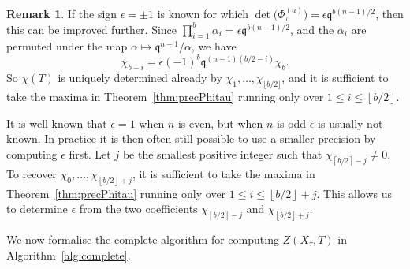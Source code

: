 \documentclass[a4paper,11pt]{article}
\numberwithin{equation}{section}
\providecommand{\floor}[1]{\left\lfloor#1\right\rfloor}   %
\providecommand{\ceil}[1]{\left\lceil#1\right\rceil}   %
\theoremstyle{definition}
\newtheorem{rem}[thm]{Remark}
\begin{document}
\begin{rem} \label{rem:epsilon}
If the sign $\epsilon = \pm 1$ is known for which 
$\det \bigl(\Phi_{\tau}^{(a)} \bigr) = \epsilon \mathfrak{q}^{b(n-1)/2}$, 
then this can be improved further. Since 
$\prod_{i=1}^b \alpha_i = \epsilon \mathfrak{q}^{b(n-1)/2}$, and 
the $\alpha_i$ are permuted under the map 
$\alpha \mapsto \mathfrak{q}^{n-1}/\alpha$, we have
\begin{equation*}
\chi_{b-i}=\epsilon (-1)^{b} \mathfrak{q}^{(n-1)(b/2-i)} \chi_b. 
\end{equation*}
So $\chi(T)$ is uniquely determined already by 
$\chi_1,\dotsc,\chi_{\lfloor b/2 \rfloor}$, and it is sufficient 
to take the maxima in Theorem~\ref{thm:precPhitau} running only over 
$1 \leq i \leq \floor{b/2}$.

It is well known that $\epsilon = 1$ when $n$ is even, but when $n$ 
is odd $\epsilon$ is usually not known. In practice it is then often 
still possible to use a smaller precision by computing $\epsilon$ first. 
Let $j$ be the smallest positive integer such that $\chi_{\ceil{b/2} - j} \neq 0$. 
To recover $\chi_0, \dotsc, \chi_{\floor{b/2}+j}$, it is sufficient to take 
the maxima in Theorem~\ref{thm:precPhitau} running only over 
$1 \leq i \leq \floor{b/2}+j$. This allows us to determine $\epsilon$ from 
the two coefficients $\chi_{\ceil{b/2}-j}$ and $\chi_{\floor{b/2}+j}$. 
\end{rem}

We now formalise the complete algorithm for computing $Z(X_{\tau},T)$ 
in Algorithm~\ref{alg:complete}.
\end{document}
